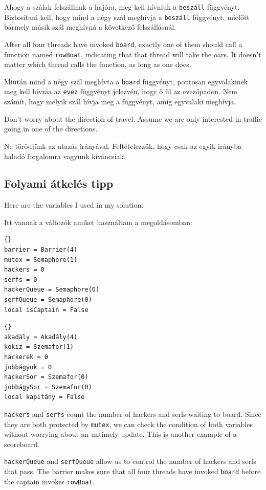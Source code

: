 \documentclass{book}
\newcommand{\clearemptydoublepage}{\newpage\cleardoublepage}
\begin{document}
Ahogy a szálak felszállnak a hajóra, meg kell hívniuk a {\tt beszáll}
függvényt. Biztosítani kell, hogy mind a négy szál
meghívja a {\tt beszáll} függvényt, mielőtt bármely másik szál meghívná a
következő felszállásnál.

After all four threads have invoked {\tt board}, exactly one of
them should call a function named {\tt rowBoat}, indicating
that that thread will take the oars.  It doesn't matter which thread
calls the function, as long as one does.

Miután mind a négy szál meghívta a {\tt board} függvényt, pontosan
egyvalakinek meg kell hívnia az {\tt evez} függvényt jelezvén, hogy ő
ül az evezőpadon. Nem számít, hogy melyik szál hívja meg a függvényt,
amíg egyvalaki meghívja.

Don't worry about the direction of travel.  Assume we are
only interested in traffic going in one of the directions.

Ne törődjünk az utazás irányával. Feltételezzük, hogy csak
az egyik irányba haladó forgalomra vagyunk kíváncsiak.

\clearemptydoublepage
\subsection{Folyami átkelés tipp}

Here are the variables I used in my solution:

Itt vannak a változók amiket használtam a
megoldásomban:

\begin{lstlisting}[title={River crossing hint}]{}
barrier = Barrier(4)
mutex = Semaphore(1)
hackers = 0
serfs = 0
hackerQueue = Semaphore(0)
serfQueue = Semaphore(0)
local isCaptain = False
\end{lstlisting}

\begin{lstlisting}[title={River crossing hint}]{}
akadály = Akadály(4)
kökiz = Szemafor(1)
hackerek = 0
jobbágyok = 0
hackerSor = Szemafor(0)
jobbágySor = Szemafor(0)
local kapitány = False
\end{lstlisting}

{\tt hackers} and {\tt serfs} count the number of hackers
and serfs waiting to board.  Since they are both protected by
{\tt mutex}, we can check the condition of both variables without
worrying about an untimely update.  This is another example
of a scoreboard.

{\tt hackerQueue} and {\tt serfQueue} allow us to control the number
of hackers and serfs that pass.  The barrier
makes sure that all four threads have invoked
{\tt board} before the captain invokes {\tt rowBoat}.
\end{document}
